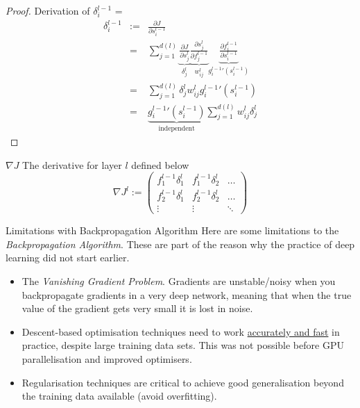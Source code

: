 \documentclass[11pt,a4paper]{article}
\begin{document}
  \begin{proof}{Derivation of $\delta_i^{l-1}$}
    \everymath={\displaystyle}
    \[\begin{array}{rrl}
      \delta_i^{l-1}&:=&\frac{\partial J}{\partial s_i^{l-1}}\\
      &=&\sum_{j=1}^{d(l)}\underbrace{\frac{\partial J}{\partial s_j^l}}_{\delta_j^l} \underbrace{\frac{\partial s_j^l}{\partial f_j^{l-1}}}_{w_{ij}^l} \underbrace{\frac{\partial f_i^{l-1}}{\partial s_i^{l-1}}}_{{g^{l-1}_i}'(s_i^{l-1})}\\
      &=&\sum_{j=1}^{d(l)}\delta_j^lw_{ij}^l{g_i^{l-1}}'(s_i^{l-1})\\
      &=&\underbrace{{g_i^{l-1}}'(s_i^{l-1})}_\text{independent}\sum_{j=1}^{d(l)}w_{ij}^l\delta_j^l
      \end{array}\]
  \end{proof}

  \begin{definition}{$\nabla J$}
    The derivative for layer $l$ defined below
    \[ \nabla J^l:=\begin{pmatrix}
      f_1^{l-1}\delta_1^l & f_1^{l-1}\delta_2^l & \dots \\
      f_2^{l-1}\delta_1^l & f_2^{l-1}\delta_2^l & \dots \\
      \vdots & \vdots & \ddots
    \end{pmatrix} \] %
  \end{definition}

  \begin{remark}{Limitations with Backpropagation Algorithm}
    Here are some limitations to the \textit{Backpropagation Algorithm}. These are part of the reason why the practice of deep learning did not start earlier.
    \begin{itemize}
      \item The \textit{Vanishing Gradient Problem}. Gradients are unstable/noisy when you backpropagate gradients in a very deep network, meaning that when the true value of the gradient gets very small it is lost in noise.
      \item Descent-based optimisation techniques need to work \underline{accurately and fast} in practice, despite large training data sets. This was not possible before GPU parallelisation and improved optimisers.
      \item Regularisation techniques are critical to achieve good generalisation beyond the training data available (avoid overfitting).
    \end{itemize}
  \end{remark}
\end{document}
